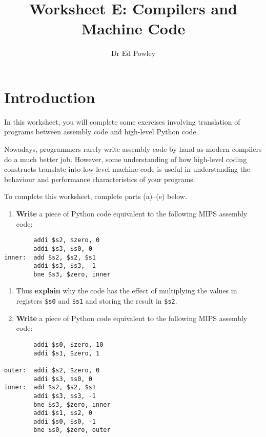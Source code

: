 \documentclass{../../fal_assignment}
\title{Worksheet E: Compilers and Machine Code}
\author{Dr Ed Powley}
\begin{document}
\maketitle
{}

\section*{Introduction}

In this worksheet, you will complete some exercises involving translation of programs between assembly code and high-level Python code.

Nowadays, programmers rarely write assembly code by hand as modern compilers do a much better job.
However, some understanding of how high-level coding constructs translate into low-level machine code
is useful in understanding the behaviour and performance characteristics of your programs.

To complete this worksheet, complete parts (a)--(e) below.

\begin{enumerate}[label=(\alph*)]
	\item \textbf{Write} a piece of Python code equivalent to the following MIPS assembly code:
\end{enumerate}

\begin{lstlisting}
        addi $s2, $zero, 0
        addi $s3, $s0, 0
inner:  add $s2, $s2, $s1
        addi $s3, $s3, -1
        bne $s3, $zero, inner
\end{lstlisting}

\begin{enumerate}[resume,label=(\alph*)]
	\item Thus \textbf{explain} why the code has the effect of multiplying the values in registers \lstinline{$s0} and \lstinline{$s1}
	and storing the result in \lstinline{$s2}.
	\item \textbf{Write} a piece of Python code equivalent to the following MIPS assembly code:
\end{enumerate}

\begin{lstlisting}
        addi $s0, $zero, 10
        addi $s1, $zero, 1

outer:  addi $s2, $zero, 0
        addi $s3, $s0, 0
inner:  add $s2, $s2, $s1
        addi $s3, $s3, -1
        bne $s3, $zero, inner
        addi $s1, $s2, 0
        addi $s0, $s0, -1
        bne $s0, $zero, outer
\end{lstlisting}
\end{document}
